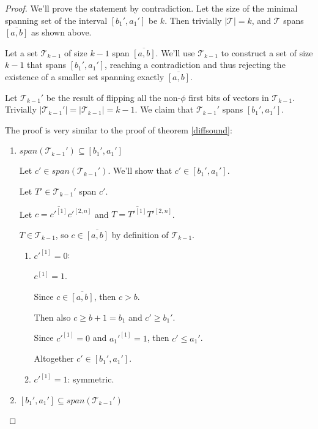 \documentclass{article}
\theoremstyle{plain}
\theoremstyle{definition}
\newcommand{\interval}[2]{[#1, #2]}
\newcommand{\compl}[1]{\overline{#1}}
\newcommand{\finterval}[2]{\compl{\interval{#1}{#2}}}
\newcommand{\bit}[2]{#1^{[#2]}}
\newcommand{\bits}[3]{#1^{\interval{#2}{#3}}}
\begin{document}
\begin{proof}
We'll prove the statement by contradiction.
Let the size of the minimal spanning set
of the interval $\interval{b_1'}{a_1'}$ be $k$.
Then trivially $|\mathcal{T}| = k$,
and $\mathcal{T}$ spans $\finterval{a}{b}$ as shown above.

Let a set $\mathcal{T}_{k-1}$ of size $k-1$
span $\finterval{a}{b}$.
We'll use $\mathcal{T}_{k-1}$ to construct
a set of size $k-1$ that spans $\interval{b_1'}{a_1'}$,
reaching a contradiction
and thus rejecting the existence
of a smaller set spanning exactly $\finterval{a}{b}$.

Let $\mathcal{T}_{k-1}'$ be the result of flipping all
the non-$\phi$ first bits
of vectors in $\mathcal{T}_{k-1}$.
Trivially
$|\mathcal{T}_{k-1}'| = |\mathcal{T}_{k-1}| = k-1$.
We claim that $\mathcal{T}_{k-1}'$
spans $\interval{b_1'}{a_1'}$.

The proof is very similar
to the proof of theorem \ref{diffsound}:

\begin{enumerate}
\item
$span(\mathcal{T}_{k-1}') \subseteq \interval{b_1'}{a_1'}$

Let $c' \in span(\mathcal{T}_{k-1}')$.
We'll show that $c' \in \interval{b_1'}{a_1'}$.

Let $T' \in \mathcal{T}_{k-1}'$ span $c'$.

Let $c = \compl{\bit{c'}{1}} \bits{c'}{2}{n}$
and $T = \compl{\bit{T'}{1}} \bits{T'}{2}{n}$.

$T \in \mathcal{T}_{k-1}$,
so $c \in \finterval{a}{b}$
by definition of $\mathcal{T}_{k-1}$.

\begin{enumerate}
\item $\bit{c'}{1} = 0$:

$\bit{c}{1} = 1$.

Since $c \in \finterval{a}{b}$, then $c > b$.

Then also
$c \geq b + 1 = b_1$
and
$c' \geq b_1'$.

Since $\bit{c'}{1} = 0$ and $\bit{a_1'}{1} = 1$,
then $c' \leq a_1'$.

Altogether $c' \in \interval{b_1'}{a_1'}$.

\item $\bit{c'}{1} = 1$: symmetric.
\end{enumerate}

\item
$\interval{b_1'}{a_1'} \subseteq span(\mathcal{T}_{k-1}')$


\end{enumerate}
\end{proof}
\end{document}
